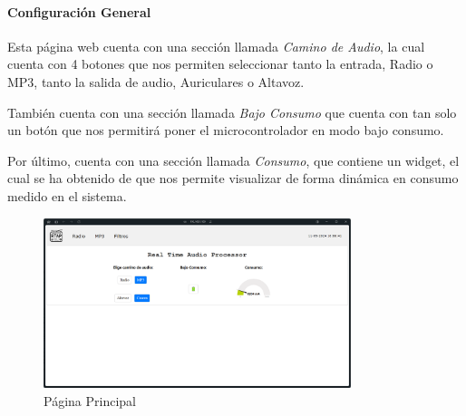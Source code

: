 \paragraph{Configuración General}
Esta página web cuenta con una sección llamada \textit{Camino de Audio}, la cual cuenta con 4 botones que nos permiten seleccionar tanto la entrada, Radio o MP3, tanto la salida de audio, Auriculares o Altavoz.

También cuenta con una sección llamada \textit{Bajo Consumo} que cuenta con tan solo un botón que nos permitirá poner el microcontrolador en modo bajo consumo.

Por último, cuenta con una sección llamada \textit{Consumo}, que contiene un widget, el cual se ha obtenido de \cite{JustGage} que nos permite visualizar de forma dinámica en consumo medido en el sistema.

\begin{figure}[h]
    \centering
    \includegraphics[width=0.8\textwidth]{images/3/3-1/3-1-1-1/Pagina_Principal.png}
    \caption{Página Principal}
    \label{fig:3-1-1-1-Principal}
\end{figure}